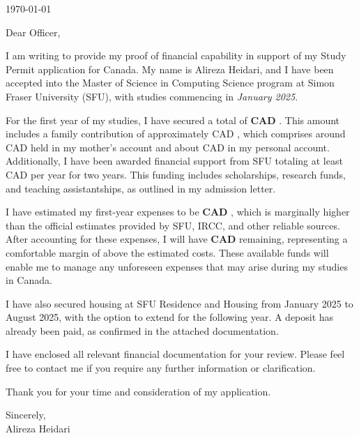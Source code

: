\thispagestyle{plain}

\noindent
\today

\coverLetterRecipient


Dear Officer,

I am writing to provide my proof of financial capability in support of my Study Permit application for Canada. My name is Alireza Heidari, and I have been accepted into the Master of Science in Computing Science program at Simon Fraser University (SFU), with studies commencing in \textit{January 2025}.

For the first year of my studies, I have secured a total of \textbf{CAD {\totalFunds}}. This amount includes a family contribution of approximately CAD {\sponsorFunds}, which comprises around CAD {\sponsorFunds} held in my mother's account and about CAD {\selfFunds} in my personal account. Additionally, I have been awarded financial support from SFU totaling at least CAD {\universityFunds} per year for two years. This funding includes scholarships, research funds, and teaching assistantships, as outlined in my admission letter. 

I have estimated my first-year expenses to be \textbf{CAD {\totalExpenses}}, which is marginally higher than the official estimates provided by SFU, IRCC, and other reliable sources. After accounting for these expenses, I will have \textbf{CAD {\remainingFunds}} remaining, representing a comfortable margin of \textbf{{\remainingFundsToExpensesPercentage}} above the estimated costs. These available funds will enable me to manage any unforeseen expenses that may arise during my studies in Canada.

I have also secured housing at SFU Residence and Housing from January 2025 to August 2025, with the option to extend for the following year. A deposit has already been paid, as confirmed in the attached documentation.

I have enclosed all relevant financial documentation for your review. Please feel free to contact me if you require any further information or clarification.

Thank you for your time and consideration of my application.

\noindent
Sincerely,\\
Alireza Heidari

\clearpage
